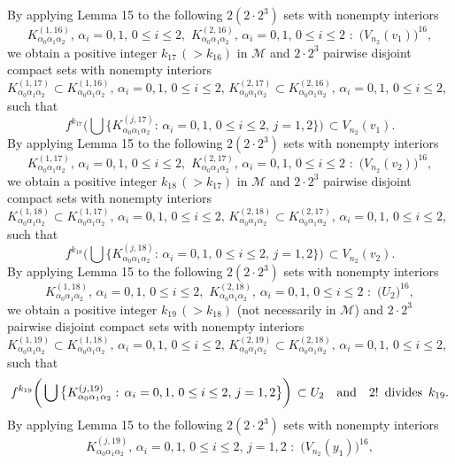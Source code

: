 \documentclass[12pt]{article}
\newcommand{\al}{\alpha}
\begin{document}
\indent By applying Lemma 15 to the following $2(2 \cdot 2^3)$ sets with nonempty interiors 
$$
K_{\al_0\al_1\al_2}^{(1,16)}, \, \al_i = 0, 1, \, 0 \le i \le 2, \,\, K_{\al_0\al_1\al_2}^{(2,16)}, \, \al_i = 0, 1, \, 0 \le i \le 2 \,\, : \,\, \big(V_{n_2}(v_1)\big)^{16},
$$
we obtain a positive integer $k_{17} \, (> k_{16})$ in $\mathcal M$ and $2 \cdot 2^3$ pairwise disjoint compact sets with nonempty interiors $K_{\al_0\al_1\al_2}^{(1,17)} \subset K_{\al_0\al_1\al_2}^{(1,16)}, \, \al_i = 0, 1, \, 0 \le i \le 2, \, K_{\al_0\al_1\al_2}^{(2,17)} \subset K_{\al_0\al_1\al_2}^{(2,16)}, \, \al_i = 0, 1, \, 0 \le i \le 2$, such that 
$$
f^{k_{17}}\bigg(\bigcup \big\{ K_{\al_0\al_1\al_2}^{(j,17)}: \, \al_i = 0, 1, \, 0 \le i \le 2, \, j = 1, 2 \big\}\bigg) \, \subset V_{n_2}(v_1).
$$
\indent By applying Lemma 15 to the following $2(2 \cdot 2^3)$ sets with nonempty interiors 
$$
K_{\al_0\al_1\al_2}^{(1,17)}, \, \al_i = 0, 1, \, 0 \le i \le 2, \,\, K_{\al_0\al_1\al_2}^{(2,17)}, \, \al_i = 0, 1, \, 0 \le i \le 2 \,\, : \,\, \big(V_{n_2}(v_2)\big)^{16},
$$
we obtain a positive integer $k_{18} \, (> k_{17})$ in $\mathcal M$ and $2 \cdot 2^3$ pairwise disjoint compact sets with nonempty interiors $K_{\al_0\al_1\al_2}^{(1,18)} \subset K_{\al_0\al_1\al_2}^{(1,17)}, \, \al_i = 0, 1, \, 0 \le i \le 2, \, K_{\al_0\al_1\al_2}^{(2,18)} \subset K_{\al_0\al_1\al_2}^{(2,17)}, \, \al_i = 0, 1, \, 0 \le i \le 2$, such that 
$$
f^{k_{18}}\bigg(\bigcup \big\{ K_{\al_0\al_1\al_2}^{(j,18)}: \, \al_i = 0, 1, \, 0 \le i \le 2, \, j = 1, 2 \big\}\bigg) \, \subset V_{n_2}(v_2).
$$
\indent By applying Lemma 15 to the following $2(2 \cdot 2^3)$ sets with nonempty interiors 
$$
K_{\al_0\al_1\al_2}^{(1,18)}, \, \al_i = 0, 1, \, 0 \le i \le 2, \,\, K_{\al_0\al_1\al_2}^{(2,18)}, \, \al_i = 0, 1, \, 0 \le i \le 2 \,\, : \,\, \big(U_2\big)^{16},
$$
we obtain a positive integer $k_{19} \, (> k_{18})$ \big(not necessarily in $\mathcal M$\big) and $2 \cdot 2^3$ pairwise disjoint compact sets with nonempty interiors $K_{\al_0\al_1\al_2}^{(1,19)} \subset K_{\al_0\al_1\al_2}^{(1,18)}, \, \al_i = 0, 1, \, 0 \le i \le 2, \, K_{\al_0\al_1\al_2}^{(2,19)} \subset K_{\al_0\al_1\al_2}^{(2,18)}, \, \al_i = 0, 1, \, 0 \le i \le 2$, such that 
$$
f^{k_{19}}\bigg(\bigcup \big\{ K_{\al_0\al_1\al_2}^{(j,19)}: \, \al_i = 0, 1, \, 0 \le i \le 2, \, j = 1, 2 \big\}\bigg) \, \subset U_2 \quad \text{and} \quad 2! \,\,\, \text{divides} \,\,\, k_{19}. \vspace{.1in}
$$           
\indent By applying Lemma 15 to the following $2(2 \cdot 2^3)$ sets with nonempty interiors 
$$
K_{\al_0\al_1\al_2}^{(j,19)}, \, \al_i = 0, 1, \, 0 \le i \le 2, \, j = 1, 2 \,\, : \,\, \big(V_{n_2}(y_1)\big)^{16},
$$
\end{document}
